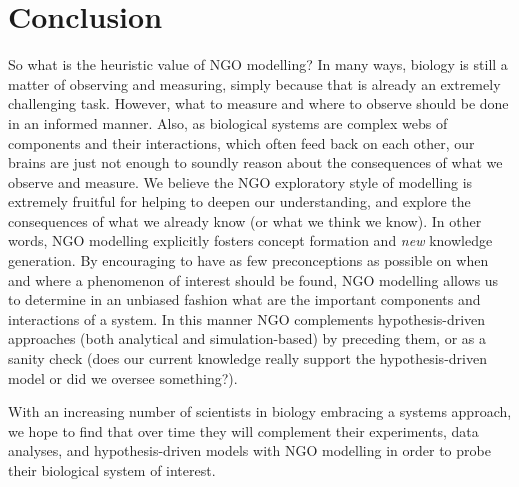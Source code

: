\section{Conclusion}

So what is the heuristic value of NGO modelling? In many ways, biology is still a matter of observing and measuring, simply because that is already an extremely challenging task. However, what to measure and where to observe should be done in an informed manner. Also, as biological systems are complex webs of components and their interactions, which often feed back on each other, our brains are just not enough to soundly reason about the consequences of what we observe and measure. We believe the NGO exploratory style of modelling is extremely fruitful for helping to deepen our understanding, and explore the consequences of what we already know (or what we think we know). In other words, NGO modelling explicitly fosters concept formation and \emph{new} knowledge generation. By encouraging to have as few preconceptions as possible on when and where a phenomenon of interest should be found, NGO modelling allows us to determine in an unbiased fashion what are the important components and interactions of a system. In this manner NGO complements hypothesis-driven approaches (both analytical and simulation-based) by preceding them, or as a sanity check (does our current knowledge really support the hypothesis-driven model or did we oversee something?).

With an increasing number of scientists in biology embracing a systems approach, we hope to find that over time they will complement their experiments, data analyses, and hypothesis-driven models with NGO modelling in order to probe their biological system of interest.